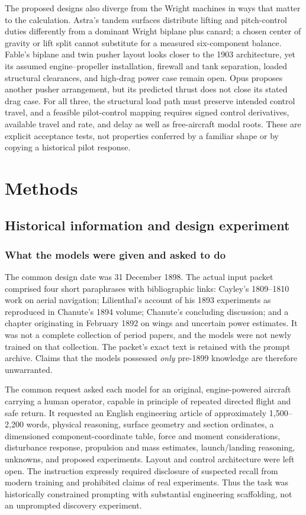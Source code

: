 \documentclass[10pt,letterpaper]{article}
\begin{document}
The proposed designs also diverge from the Wright machines in ways that
matter to the calculation. Astra's tandem surfaces distribute lifting and
pitch-control duties differently from a dominant Wright biplane plus
canard; a chosen center of gravity or lift split cannot substitute for a
measured six-component balance. Fable's biplane and twin pusher layout
looks closer to the 1903 architecture, yet its assumed engine--propeller
installation, firewall and tank separation, loaded structural clearances,
and high-drag power case remain open. Opus proposes another pusher
arrangement, but its predicted thrust does not close its stated drag case.
For all three, the structural load path must preserve intended control
travel, and a feasible pilot-control mapping requires signed control
derivatives, available travel and rate, and delay as well as free-aircraft
modal roots. These are explicit acceptance tests, not properties conferred
by a familiar shape or by copying a historical pilot response.


\section{Methods}
\subsection{Historical information and design experiment}
\subsubsection{What the models were given and asked to do}
The common design date was 31 December 1898. The actual input packet comprised four short paraphrases with bibliographic links: Cayley's 1809--1810 work on aerial navigation; Lilienthal's account of his 1893 experiments as reproduced in Chanute's 1894 volume; Chanute's concluding discussion; and a chapter originating in February 1892 on wings and uncertain power estimates. It was not a complete collection of period papers, and the models were not newly trained on that collection. The packet's exact text is retained with the prompt archive. Claims that the models possessed \emph{only} pre-1899 knowledge are therefore unwarranted.

The common request asked each model for an original, engine-powered aircraft carrying a human operator, capable in principle of repeated directed flight and safe return. It requested an English engineering article of approximately 1,500--2,200 words, physical reasoning, surface geometry and section ordinates, a dimensioned component-coordinate table, force and moment considerations, disturbance response, propulsion and mass estimates, launch/landing reasoning, unknowns, and proposed experiments. Layout and control architecture were left open. The instruction expressly required disclosure of suspected recall from modern training and prohibited claims of real experiments. Thus the task was historically constrained prompting with substantial engineering scaffolding, not an unprompted discovery experiment.
\end{document}

